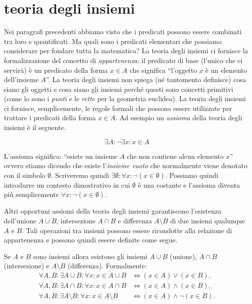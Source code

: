 \section{teoria degli insiemi}

Nei paragrafi precedenti abbiamo visto che i predicati possono essere
combinati tra loro e quantificati.
Ma quali sono i predicati elementari che possiamo considerare per fondare 
tutta la matematica?
La teoria degli insiemi ci fornisce la formalizzazione del concetto
di \emph{appartenenza}: il predicato di base (l'unico che ci servirà) è
un predicato della forma $x \in A$ che significa ``l'oggetto $x$ è un elemento
dell'insieme $A$''.
La teoria degli insiemi non spiega (né tantomento definisce)
cosa siano gli oggetti e cosa siano gli insiemi perché questi sono concetti
primitivi (come lo sono i \emph{punti} e le \emph{rette} per la geometria euclidea).
La teoria degli insiemi ci fornisce, semplicemente, le regole formali che
possono essere utilizzate per trattare i predicati della forma $x\in A$.
Ad esempio un \emph{assioma} 
della teoria degli insiemi è il seguente.
\begin{axiom}
\[
  \exists A \colon \lnot \exists x\colon x \in A
\]
\end{axiom}
L'assioma significa: ``esiste un insieme $A$ che non contiene alcun elemento $x$''
ovvero stiamo dicendo che esiste l'\emph{insieme vuoto}%
%
 che normalmente viene
denotato con il simbolo $\emptyset$.
Scriveremo quindi $\exists\emptyset\colon \forall x\colon \lnot(x\in \emptyset)$.
Possiamo quindi introdurre un contesto dimostrativo 
in cui $\emptyset$ è una costante e l'assioma diventa più
semplicemente $\forall x\colon \lnot (x\in \emptyset)$.

Altri opportuni assiomi della teoria degli insiemi garantiscono l'esistenza
dell'unione $A\cup B$, intersezione $A\cap B$ e differenza $A\setminus B$
di due insiemi qualunque $A$ e $B$. Tali operazioni
tra insiemi possono essere ricondotte alla relazione di appartenenza
e possono quindi essere definite come segue.

\begin{axiom}
Se $A$ e $B$ sono insiemi allora esistono gli insiemi  
$A\cup B$ (unione), $A\cap B$ (intersezione) e 
$A\setminus B$ (differenza).
%
%
%
%
Formalmente:
\begin{align*}
    \forall A,B\colon \exists A\cup B \colon \forall x\colon x\in A\cup B &\iff (x\in A) \lor (x\in B),\\
    \forall A,B\colon \exists A\cap B \colon \forall x\colon x\in A\cap B &\iff (x\in A) \land (x\in B),\\
    \forall A,B\colon \exists A\setminus B \colon \forall x\colon x\in A\setminus B &\iff (x\in A) \land \lnot (x \in B).
\end{align*}
\end{axiom}

